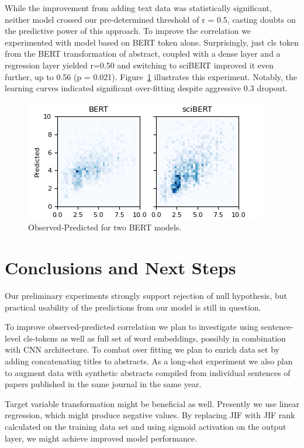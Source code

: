 \documentclass[11pt]{article}
\begin{document}
While the improvement from adding text data was statistically significant, neither model crossed our pre-determined threshold of r = 0.5, casting doubts on the predictive power of this approach. To improve the correlation we experimented with model based on BERT token alone. Surprisingly, just cls token from the BERT transformation of abstract, coupled with a dense layer and a regression layer yielded r=0.50 and switching to sciBERT improved it even further, up to 0.56 (p = 0.021). Figure~\ref{fig:BERT_vs_sciBERT} illustrates this experiment. Notably, the learning curves indicated significant over-fitting despite aggressive 0.3 dropout.

\begin{figure}
	\includegraphics[width= \columnwidth]{./Images/BERT vs sciBERT.png}
	\caption{Observed-Predicted for two BERT models.}
	\label{fig:BERT_vs_sciBERT}
\end{figure}

\section{Conclusions and Next Steps}
Our preliminary experiments strongly support rejection of null hypothesis, but practical usability of the predictions from our model is still in question.

To improve observed-predicted correlation we plan to investigate using sentence-level cls-tokens as well as full set of word embeddings, possibly in combination with CNN architecture. To combat over fitting we plan to enrich data set by adding concatenating titles to abstracts. As a long-shot experiment we also plan to augment data with synthetic abstracts compiled from individual sentences of papers published in the same journal in the same year.

Target variable transformation might be beneficial as well. Presently we use linear regression, which might produce negative values. By replacing JIF with JIF rank calculated on the training data set and using sigmoid activation on the output layer, we might achieve improved model performance. 



\end{document}

